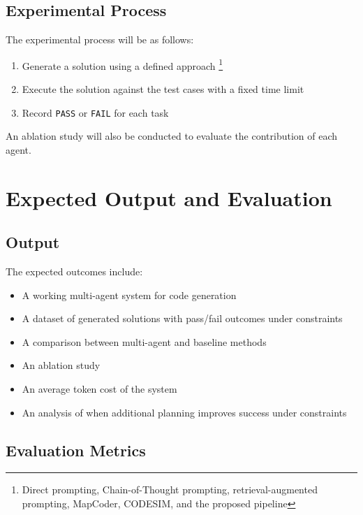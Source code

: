 \documentclass{article}
\begin{document}
\subsection*{Experimental Process}

The experimental process will be as follows:

\begin{enumerate}[noitemsep]
    \item Generate a solution using a defined approach \footnote{Direct prompting, Chain-of-Thought prompting, retrieval-augmented prompting, MapCoder, CODESIM, and the proposed pipeline}
    \item Execute the solution against the test cases with a fixed time limit
    \item Record \texttt{PASS} or \texttt{FAIL} for each task
\end{enumerate}

An ablation study will also be conducted to evaluate the contribution of each agent.

\section{Expected Output and Evaluation}

\subsection*{Output}

The expected outcomes include:

\begin{itemize}[noitemsep]
    \item A working multi-agent system for code generation
    \item A dataset of generated solutions with pass/fail outcomes under constraints
    \item A comparison between multi-agent and baseline methods
    \item An ablation study
    \item An average token cost of the system
    \item An analysis of when additional planning improves success under constraints
\end{itemize}

\subsection*{Evaluation Metrics}
\end{document}
